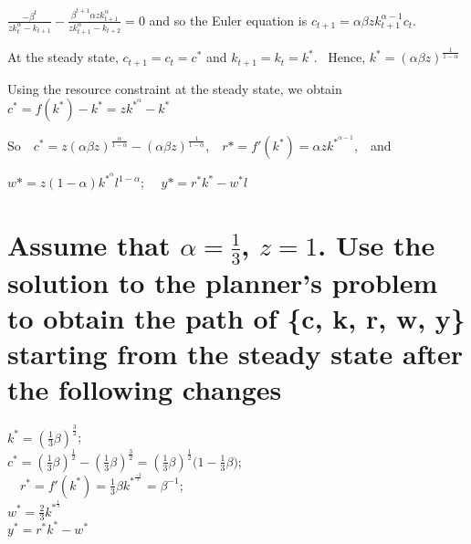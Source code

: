 \documentclass[12pt,a4paper]{article}
\begin{document}
$\frac{-\beta^{t}}{zk^{\alpha}_{t}-k_{t+1}}-\frac{\beta^{t+1} \alpha zk^{\alpha}_{t+1}}{zk^{\alpha}_{t+1}-k_{t+2}}=0$  and so the Euler equation is $c_{t+1}=\alpha \beta z k_{t+1}^{\alpha-1} c_{t}$.

At the steady state, $c_{t+1}=c_{t}=c^*$ and $k_{t+1}=k_{t}=k^*$. ~Hence, $k^*=(\alpha \beta z)^{\frac{1}{1-\alpha}}$

Using the resource constraint at the steady state, we obtain $c^*=f(k^*)-k^*=zk^{*^{\alpha}}-k^*$ 

So~~$c^*=z(\alpha \beta z)^{\frac{\alpha}{1-\alpha}}-(\alpha \beta z)^{\frac{1}{1-\alpha}}$,~~$r*=f'(k^*)=\alpha zk^{*^{\alpha-1}}$,~~and

$w*=z(1-\alpha)k^{*^{\alpha}}l^{1-\alpha}$; ~~$y*=r^*k^*-w^{*}l$

\section{ Assume that  $\alpha=\frac{1}{3}$, $z = 1$. Use the solution to the planner’s problem to obtain the path of \{c, k, r, w, y\} starting from the steady state after the following changes}

$k^*=(\frac{1}{3}\beta )^{\frac{3}{2}}$;~~\\
$c^*=(\frac{1}{3}\beta )^{\frac{1}{2}}-(\frac{1}{3}\beta )^{\frac{3}{2}}=(\frac{1}{3}\beta )^{\frac{1}{2}}\big(1-\frac{1}{3}\beta\big)$;\\ ~~$r^*=f'(k^*)=\frac{1}{3}\beta k^{*^{\frac{-2}{3}}}=\beta^{-1}$;  \\
$w^*=\frac{2}{3}k^{*^{\frac{1}{3}}}$\\
$y^*=r^*k^*-w^{*}$
\end{document}
